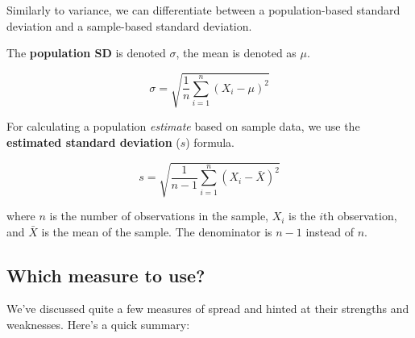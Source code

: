 \documentclass[
  11pt,
  a4paper,
  twoside,symmetric,openright]{book}
\theoremstyle{break}
\theoremstyle{break}
\begin{document}
\hypertarget{calloutSD}{}
\begin{callout}

Similarly to variance, we can differentiate between a population-based standard deviation and a sample-based standard deviation.

\begin{keepTogether}
The \textbf{population SD} is denoted \(\sigma\), the mean is denoted as \(\mu\).

\[
\sigma = \sqrt{ \frac{1}{n} \sum_{i=1}^n \left( X_i - \mu \right)^2 }
\]

\end{keepTogether}

\begin{keepTogether}
For calculating a population \emph{estimate} based on sample data, we use the \textbf{estimated standard deviation} (\(s\)) formula.

\[
s = \sqrt{ \frac{1}{n-1} \sum_{i=1}^n \left( X_i - \bar{X} \right)^2 }
\]

where \(n\) is the number of observations in the sample, \(X_i\) is the \(i\)th observation, and \(\bar{X}\) is the mean of the sample. The denominator is \(n-1\) instead of \(n\).

\end{keepTogether}

\end{callout}

\hypertarget{which-measure-to-use}{%
\subsection{Which measure to use?}\label{which-measure-to-use}}

We've discussed quite a few measures of spread and hinted at their strengths and weaknesses. Here's a quick summary:
\end{document}
